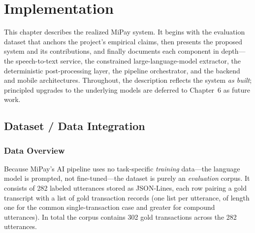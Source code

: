 \chapter{Implementation}

\setlength{\parindent}{1em}

This chapter describes the realized MiPay system. It begins with the evaluation
dataset that anchors the project's empirical claims, then presents the proposed
system and its contributions, and finally documents each component in
depth---the speech-to-text service, the constrained large-language-model
extractor, the deterministic post-processing layer, the pipeline orchestrator,
and the backend and mobile architectures. Throughout, the description reflects
the system \emph{as built}; principled upgrades to the underlying models are
deferred to Chapter~6 as future work.

\section{Dataset / Data Integration}

\subsection{Data Overview}

Because MiPay's AI pipeline uses no task-specific \emph{training} data---the
language model is prompted, not fine-tuned---the dataset is purely an
\emph{evaluation} corpus. It consists of 282 labeled utterances stored as
JSON-Lines, each row pairing a gold transcript with a list of gold transaction
records (one list per utterance, of length one for the common single-transaction
case and greater for compound utterances). In total the corpus contains 302 gold
transactions across the 282 utterances.

